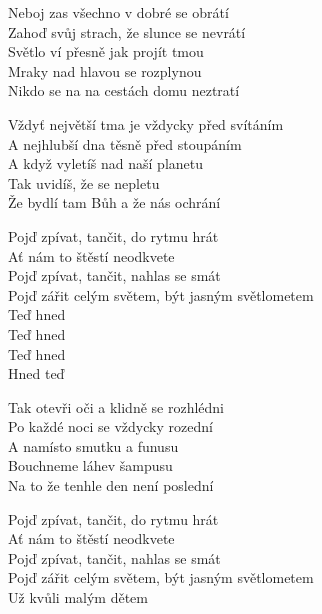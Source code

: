 
\ve{}
Neboj zas všechno v dobré se obrátí \\
Zahoď svůj strach, že slunce se nevrátí \\
Světlo ví přesně jak projít tmou\\
Mraky nad hlavou se rozplynou\\
Nikdo se na na cestách domu neztratí 

\ve{}
Vždyť největší tma je vždycky před svítáním\\
A nejhlubší dna těsně před stoupáním\\
A když vyletíš nad naší planetu\\
Tak uvidíš, že se nepletu\\
Že bydlí tam Bůh a že nás ochrání

\cho{}
Pojď zpívat, tančit, do rytmu hrát\\
Ať nám to štěstí neodkvete\\
Pojď zpívat, tančit, nahlas se smát\\
Pojď zářit celým světem, být jasným světlometem\\
Teď hned \\
Teď hned \\
Teď hned \\
Hned teď

\ve{}
Tak otevři oči a klidně se rozhlédni\\
Po každé noci se vždycky rozední\\
A namísto smutku a funusu\\
Bouchneme láhev šampusu\\
Na to že tenhle den není poslední

\cho{}
\cho{}
Pojď zpívat, tančit, do rytmu hrát\\
Ať nám to štěstí neodkvete\\
Pojď zpívat, tančit, nahlas se smát\\
Pojď zářit celým světem, být jasným světlometem\\
Už kvůli malým dětem

\esong{}

